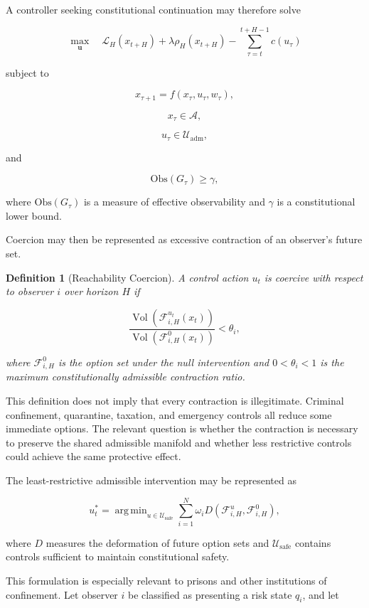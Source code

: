 \documentclass[12pt,a4paper]{article}
\newtheorem{definition}{Definition}
\DeclareMathOperator{\Vol}{Vol}
\DeclareMathOperator{\argmin}{arg\,min}
\begin{document}
A controller seeking constitutional continuation may therefore solve

\[
\max_{\mathbf{u}}
\quad
\mathcal{L}_H(x_{t+H})
+
\lambda
\rho_H(x_{t+H})
-
\sum_{\tau=t}^{t+H-1}
c(u_\tau)
\]

subject to

\[
x_{\tau+1}=f(x_\tau,u_\tau,w_\tau),
\]

\[
x_\tau\in\mathcal{A},
\]

\[
u_\tau\in\mathcal{U}_{\mathrm{adm}},
\]

and

\[
\mathrm{Obs}(G_\tau)\geq\gamma,
\]

where \(\mathrm{Obs}(G_\tau)\) is a measure of effective observability and \(\gamma\) is a constitutional lower bound.

Coercion may then be represented as excessive contraction of an observer's future set.

\begin{definition}[Reachability Coercion]
A control action \(u_t\) is coercive with respect to observer \(i\) over horizon \(H\) if

\[
\frac{
\Vol\left(\mathcal{F}_{i,H}^{u_t}(x_t)\right)
}{
\Vol\left(\mathcal{F}_{i,H}^{0}(x_t)\right)
}
<
\theta_i,
\]

where \(\mathcal{F}_{i,H}^{0}\) is the option set under the null intervention and \(0<\theta_i<1\) is the maximum constitutionally admissible contraction ratio.
\end{definition}

This definition does not imply that every contraction is illegitimate. Criminal confinement, quarantine, taxation, and emergency controls all reduce some immediate options. The relevant question is whether the contraction is necessary to preserve the shared admissible manifold and whether less restrictive controls could achieve the same protective effect.

The least-restrictive admissible intervention may be represented as

\[
u_t^{*}
=
\argmin_{u\in\mathcal{U}_{\mathrm{safe}}}
\sum_{i=1}^{N}
\omega_i
D
\left(
\mathcal{F}_{i,H}^{u},
\mathcal{F}_{i,H}^{0}
\right),
\]

where \(D\) measures the deformation of future option sets and \(\mathcal{U}_{\mathrm{safe}}\) contains controls sufficient to maintain constitutional safety.

This formulation is especially relevant to prisons and other institutions of confinement. Let observer \(i\) be classified as presenting a risk state \(q_i\), and let
\end{document}
